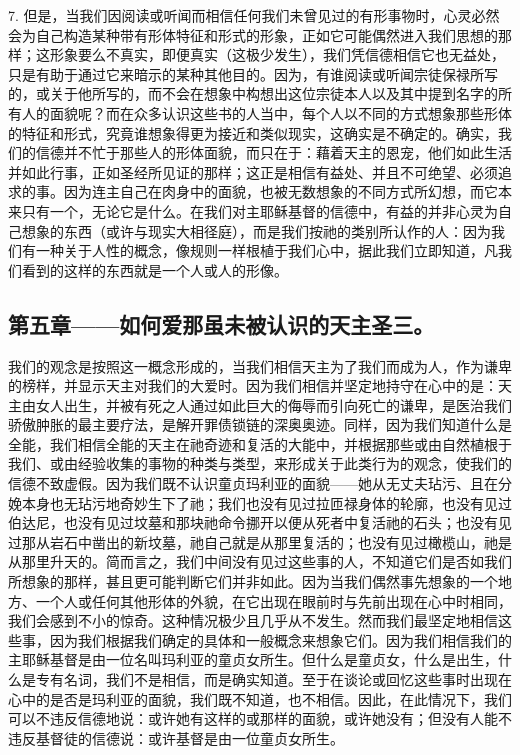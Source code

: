 7. 但是，当我们因阅读或听闻而相信任何我们未曾见过的有形事物时，心灵必然会为自己构造某种带有形体特征和形式的形象，正如它可能偶然进入我们思想的那样；这形象要么不真实，即便真实（这极少发生），我们凭信德相信它也无益处，只是有助于通过它来暗示的某种其他目的。因为，有谁阅读或听闻宗徒保禄所写的，或关于他所写的，而不会在想象中构想出这位宗徒本人以及其中提到名字的所有人的面貌呢？而在众多认识这些书的人当中，每个人以不同的方式想象那些形体的特征和形式，究竟谁想象得更为接近和类似现实，这确实是不确定的。确实，我们的信德并不忙于那些人的形体面貌，而只在于：藉着天主的恩宠，他们如此生活并如此行事，正如圣经所见证的那样；这正是相信有益处、并且不可绝望、必须追求的事。因为连主自己在肉身中的面貌，也被无数想象的不同方式所幻想，而它本来只有一个，无论它是什么。在我们对主耶稣基督的信德中，有益的并非心灵为自己想象的东西（或许与现实大相径庭），而是我们按祂的类别所认作的人：因为我们有一种关于人性的概念，像规则一样根植于我们心中，据此我们立即知道，凡我们看到的这样的东西就是一个人或人的形像。\par


\subsection{第五章——如何爱那虽未被认识的天主圣三。}

我们的观念是按照这一概念形成的，当我们相信天主为了我们而成为人，作为谦卑的榜样，并显示天主对我们的大爱时。因为我们相信并坚定地持守在心中的是：天主由女人出生，并被有死之人通过如此巨大的侮辱而引向死亡的谦卑，是医治我们骄傲肿胀的最主要疗法，是解开罪债锁链的深奥奥迹。同样，因为我们知道什么是全能，我们相信全能的天主在祂奇迹和复活的大能中，并根据那些或由自然植根于我们、或由经验收集的事物的种类与类型，来形成关于此类行为的观念，使我们的信德不致虚假。因为我们既不认识童贞玛利亚的面貌——她从无丈夫玷污、且在分娩本身也无玷污地奇妙生下了祂；我们也没有见过拉匝禄身体的轮廓，也没有见过伯达尼，也没有见过坟墓和那块祂命令挪开以便从死者中复活祂的石头；也没有见过那从岩石中凿出的新坟墓，祂自己就是从那里复活的；也没有见过橄榄山，祂是从那里升天的。简而言之，我们中间没有见过这些事的人，不知道它们是否如我们所想象的那样，甚且更可能判断它们并非如此。因为当我们偶然事先想象的一个地方、一个人或任何其他形体的外貌，在它出现在眼前时与先前出现在心中时相同，我们会感到不小的惊奇。这种情况极少且几乎从不发生。然而我们最坚定地相信这些事，因为我们根据我们确定的具体和一般概念来想象它们。因为我们相信我们的主耶稣基督是由一位名叫玛利亚的童贞女所生。但什么是童贞女，什么是出生，什么是专有名词，我们不是相信，而是确实知道。至于在谈论或回忆这些事时出现在心中的是否是玛利亚的面貌，我们既不知道，也不相信。因此，在此情况下，我们可以不违反信德地说：或许她有这样的或那样的面貌，或许她没有；但没有人能不违反基督徒的信德说：或许基督是由一位童贞女所生。\par

